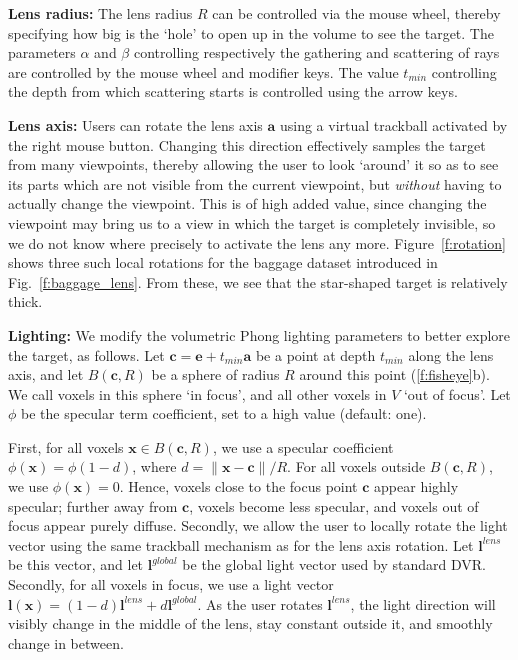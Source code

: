 \vspace{0.2cm}
\noindent\textbf{Lens radius:} The lens radius $R$ can be controlled via the mouse wheel, thereby specifying how big is the `hole' to open up in the volume to see the target. The parameters $\alpha$ and $\beta$ controlling respectively the gathering and scattering of rays are controlled by the mouse wheel and modifier keys. The value $t_{min}$ controlling the depth from which scattering starts is controlled using the arrow keys.

\vspace{0.2cm}
\noindent\textbf{Lens axis:} Users can rotate the lens axis $\mathbf{a}$ using a virtual trackball activated by the right mouse button. Changing this direction effectively samples the target from many viewpoints, thereby allowing the user to look `around' it so as to see its parts which are not visible from the current viewpoint, but \emph{without} having to actually change the viewpoint. This is of high added value, since changing the viewpoint may bring us to a view in which the target is completely invisible, so we do not know where precisely to activate the lens any more. Figure~\ref{f:rotation} shows three such local rotations for the baggage dataset introduced in Fig.~\ref{f:baggage_lens}. From these, we see that the star-shaped target is relatively thick.

\vspace{0.2cm}
\noindent\textbf{Lighting:} We modify the volumetric Phong lighting parameters to better explore the target, as follows. Let $\mathbf{c} = \mathbf{e} + t_{min}\mathbf{a}$ be a point at depth $t_{min}$ along the lens axis, and let $B(\mathbf{c},R)$ be a sphere of radius $R$ around this point (\autoref{f:fisheye}b). We call voxels in this sphere `in focus', and all other voxels in $V$ `out of focus'. Let $\phi$ be the specular term coefficient, set to a high value (default: one).

First, for all voxels $\mathbf{x} \in B(\mathbf{c},R)$, we use a specular coefficient $\phi(\mathbf{x}) = \phi (1-d)$, where $d=\|\mathbf{x}-\mathbf{c}\|/R$. For all voxels outside $B(\mathbf{c},R)$, we use $\phi(\mathbf{x}) = 0$. Hence, voxels close to the focus point $\mathbf{c}$ appear highly specular; further away from $\mathbf{c}$, voxels become less specular, and voxels out of focus appear purely diffuse. Secondly, we allow the user to locally rotate the light vector using the same trackball mechanism as for the lens axis rotation. Let $\mathbf{l}^{lens}$ be this vector, and let $\mathbf{l}^{global}$ be the global light vector used by standard DVR. Secondly, for all voxels in focus, we use a light vector $\mathbf{l}(\mathbf{x}) = (1 - d)\mathbf{l}^{lens} + d\mathbf{l}^{global}$. As the user rotates $\mathbf{l}^{lens}$, the light direction will visibly change in the middle of the lens, stay constant outside it, and smoothly change in between.

